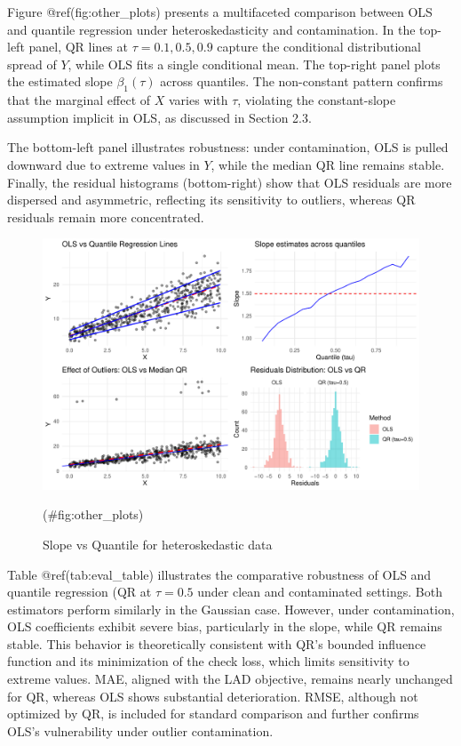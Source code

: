 \documentclass[fleqn,10pt]{latex/stylish_article} %
\begin{document}
Figure @ref(fig:other\_plots) presents a multifaceted comparison between OLS and quantile regression under heteroskedasticity and contamination. In the top-left panel, QR lines at \(\tau = 0.1, 0.5, 0.9\) capture the conditional distributional spread of \(Y\), while OLS fits a single conditional mean. The top-right panel plots the estimated slope \(\beta_1(\tau)\) across quantiles. The non-constant pattern confirms that the marginal effect of \(X\) varies with \(\tau\), violating the constant-slope assumption implicit in OLS, as discussed in Section 2.3.

The bottom-left panel illustrates robustness: under contamination, OLS is pulled downward due to extreme values in \(Y\), while the median QR line remains stable. Finally, the residual histograms (bottom-right) show that OLS residuals are more dispersed and asymmetric, reflecting its sensitivity to outliers, whereas QR residuals remain more concentrated.

\begin{figure}

{\centering \includegraphics[width=0.8\linewidth]{ADR_project_draft_files/figure-latex/other_plots-1} 

}

\caption{Slope vs Quantile for heteroskedastic data}(\#fig:other_plots)
\end{figure}

Table @ref(tab:eval\_table) illustrates the comparative robustness of OLS and quantile regression (QR at \(\tau = 0.5\) under clean and contaminated settings. Both estimators perform similarly in the Gaussian case. However, under contamination, OLS coefficients exhibit severe bias, particularly in the slope, while QR remains stable. This behavior is theoretically consistent with QR's bounded influence function and its minimization of the check loss, which limits sensitivity to extreme values. MAE, aligned with the LAD objective, remains nearly unchanged for QR, whereas OLS shows substantial deterioration. RMSE, although not optimized by QR, is included for standard comparison and further confirms OLS's vulnerability under outlier contamination.
\end{document}
